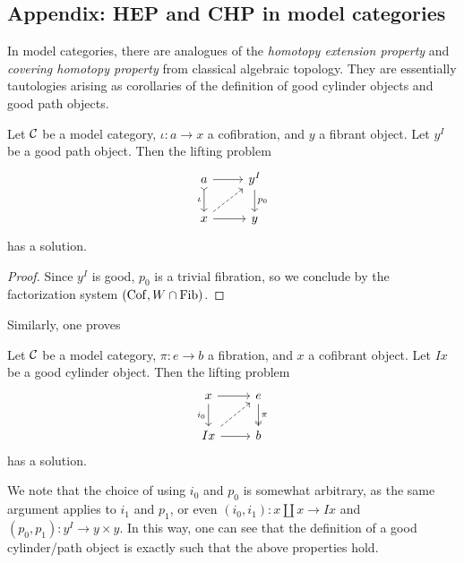 \subsection{Appendix: HEP and CHP in model categories}
In model categories, there are analogues of the \emph{homotopy extension property} and \emph{covering homotopy property} from classical algebraic topology.
They are essentially tautologies arising as corollaries of the definition of good cylinder objects and good path objects.

\begin{lemma}
	Let \(\mathcal{C}\) be a model category, \(\iota\!:a\to x\) a cofibration, and \(y\) a fibrant object. Let \(y^I\) be a good path object.
	Then the lifting problem
	\[
		\begin{tikzcd}
			a\ar[d,tail,"\iota"']\ar[r] & y^I\ar[d,"p_0"] \\
			x\ar[r]\ar[ur,dashed] & y
		\end{tikzcd}
	\]
	has a solution.
\end{lemma}
\begin{proof}
Since \(y^I\) is good, \(p_0\) is a trivial fibration, so we conclude by the factorization system \((\operatorname{Cof},W\cap\operatorname{Fib})\).
\end{proof}
Similarly, one proves
\begin{lemma}
	Let \(\mathcal{C}\) be a model category, \(\pi\!:e\to b\) a fibration, and \(x\) a cofibrant object. Let \(Ix\) be a good cylinder object.
	Then the lifting problem
	\[
		\begin{tikzcd}
			x\ar[d,"i_0"']\ar[r] & e\ar[d,two heads,"\pi"] \\
			Ix\ar[r]\ar[ur,dashed] & b
		\end{tikzcd}
	\]
	has a solution.
\end{lemma}
\begin{remark}
	We note that the choice of using \(i_0\) and \(p_0\) is somewhat arbitrary, as the same argument applies to \(i_1\) and \(p_1\), or even
	\((i_0,i_1)\!:x\amalg x \to Ix\) and \((p_0,p_1)\!:y^I \to y\times y\). In this way, one can see that the definition of a good cylinder/path object
	is exactly such that the above properties hold.
\end{remark}
